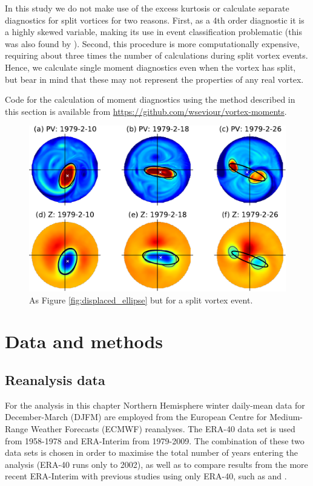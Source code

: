 In this study we do not make use of the excess kurtosis or calculate separate
diagnostics for split vortices for two reasons. First, as a 4th order diagnostic
it is a highly skewed variable, making its use in event classification
problematic (this was also found by \citet{Hannachi2010}). Second, this
procedure is more computationally expensive, requiring about three times the
number of calculations during split vortex events. Hence, we calculate single
moment diagnostics even when the vortex has split, but bear in mind that these
may not represent the properties of any real vortex. 

Code for the calculation of moment diagnostics using the method described
in this section is available from
\url{https://github.com/wseviour/vortex-moments}.

\begin{figure}
 \centering
 \noindent\includegraphics[width=\textwidth]{figures/chapter-moments/PV_GPH_1979.pdf}
 \caption[Equivalent ellipse for a spit vortex event.]{As Figure
   \ref{fig:displaced_ellipse} but for a split vortex event.}
 \label{fig:split_ellipse}
\end{figure}


\section{Data and methods}
\label{sec:methodology}

\subsection{Reanalysis data}

For the analysis in this chapter Northern Hemisphere winter daily-mean data for
December-March (DJFM) are employed from the European Centre for Medium-Range
Weather Forecasts (ECMWF) reanalyses. The ERA-40 data set \citep{Uppala2005} is
used from 1958-1978 and ERA-Interim \citep{Dee2011} from 1979-2009. The
combination of these two data sets is chosen in order to maximise the total
number of years entering the analysis (ERA-40 runs only to 2002), as well as to
compare results from the more recent ERA-Interim with previous studies using
only ERA-40, such as \citet{Charlton2007} and \citet{Mitchell2013}.

